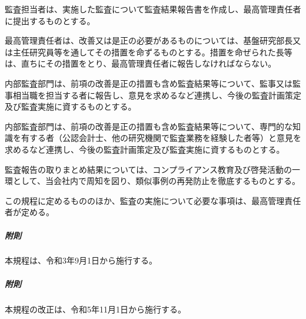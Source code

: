 \documentclass[10pt,a4paper,uplatex]{jsarticle}
\begin{document}
監査担当者は、実施した監査について監査結果報告書を作成し、最高管理責任者に提出するものとする。

最高管理責任者は、改善又は是正の必要があるものについては、基盤研究部長又は主任研究員等を通してその措置を命ずるものとする。措置を命ぜられた長等は、直ちにその措置をとり、最高管理責任者に報告しなければならない。

内部監査部門は、前項の改善是正の措置も含め監査結果等について、監事又は監事相当職を担当する者に報告し、意見を求めるなど連携し、今後の監査計画策定及び監査実施に資するものとする。

内部監査部門は、前項の改善是正の措置も含め監査結果等について、専門的な知識を有する者（公認会計士、他の研究機関で監査業務を経験した者等）と意見を求めるなど連携し、今後の監査計画策定及び監査実施に資するものとする。

監査報告の取りまとめ結果については、コンプライアンス教育及び啓発活動の一環として、当会社内で周知を図り、類似事例の再発防止を徹底するものとする。

この規程に定めるもののほか、監査の実施について必要な事項は、最高管理責任者が定める。

\vspace{1cm}
\subparagraph{附則} 本規程は、令和3年9月1日から施行する。
\subparagraph{附則} 本規程の改正は、令和5年11月1日から施行する。
\end{document}
